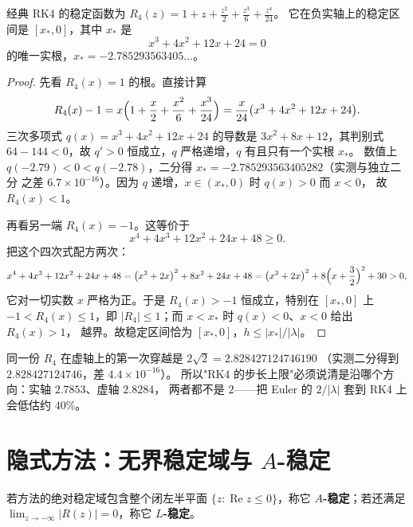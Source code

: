 \begin{theorem}[RK4 的实轴稳定区间由三次方程给出]
\label{thm:rk4-real}
经典 RK4 的稳定函数为 $R_4(z)=1+z+\tfrac{z^2}{2}+\tfrac{z^3}{6}+\tfrac{z^4}{24}$。
它在负实轴上的稳定区间是 $[x_*,0]$，其中 $x_*$ 是
\begin{equation}
  x^3+4x^2+12x+24=0
  \label{eq:cubic}
\end{equation}
的唯一实根，$x_*=-2.785293563405\ldots$。
\end{theorem}

\begin{proof}
先看 $R_4(x)=1$ 的根。直接计算
\[
  R_4(x)-1=x\Bigl(1+\frac x2+\frac{x^2}6+\frac{x^3}{24}\Bigr)
            =\frac{x}{24}\bigl(x^3+4x^2+12x+24\bigr).
\]
三次多项式 $q(x)=x^3+4x^2+12x+24$ 的导数是 $3x^2+8x+12$，其判别式
$64-144<0$，故 $q'>0$ 恒成立，$q$ 严格递增，$q$ 有且只有一个实根 $x_*$。
数值上 $q(-2.79)<0<q(-2.78)$，二分得 $x_*=-2.785293563405282$（实测与独立二分
之差 $6.7\times10^{-16}$）。因为 $q$ 递增，$x\in(x_*,0)$ 时 $q(x)>0$ 而 $x<0$，
故 $R_4(x)<1$。

再看另一端 $R_4(x)=-1$。这等价于
\[
  x^4+4x^3+12x^2+24x+48\ge0 .
\]
把这个四次式配方两次：
\[
  x^4+4x^3+12x^2+24x+48
  =\bigl(x^2+2x\bigr)^2+8x^2+24x+48
  =\bigl(x^2+2x\bigr)^2+8\Bigl(x+\frac32\Bigr)^2+30>0,
\]
它对一切实数 $x$ 严格为正。于是 $R_4(x)>-1$ 恒成立，特别在 $[x_*,0]$ 上
$-1<R_4(x)\le1$，即 $|R_4|\le1$；而 $x<x_*$ 时 $q(x)<0$、$x<0$ 给出 $R_4(x)>1$，
越界。故稳定区间恰为 $[x_*,0]$，$h\le|x_*|/|\lambda|$。
\end{proof}

\begin{remark}[实轴与虚轴要分开看]
同一份 $R_4$ 在虚轴上的第一次穿越是 $2\sqrt2=2.828427124746190$
（实测二分得到 $2.828427124746$，差 $4.4\times10^{-16}$）。
所以"RK4 的步长上限"必须说清是沿哪个方向：实轴 $2.7853$、虚轴 $2.8284$，
两者都不是 $2$——把 Euler 的 $2/|\lambda|$ 套到 RK4 上会低估约 $40\%$。
\end{remark}

\section{隐式方法：无界稳定域与 $A$-稳定}

\begin{definition}[$A$-稳定与 $L$-稳定]
若方法的绝对稳定域包含整个闭左半平面 $\{z:\operatorname{Re}z\le0\}$，称它
\textbf{$A$-稳定}；若还满足 $\lim_{z\to-\infty}|R(z)|=0$，称它 \textbf{$L$-稳定}。
\end{definition}

